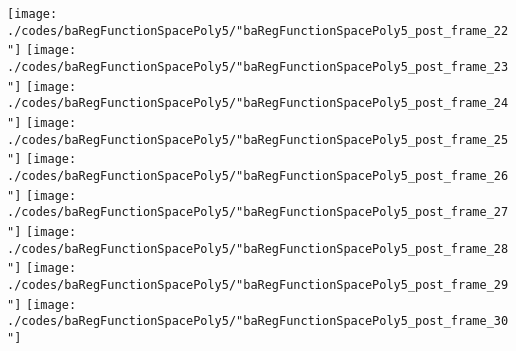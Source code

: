 \begin{frame}{\insertsection}
\begin{center}
{\begin{animateinline}{20}
				 \texttt{[image: ./codes/baRegFunctionSpacePoly5/"baRegFunctionSpacePoly5\_post\_frame\_22"]}\newframe
				 \texttt{[image: ./codes/baRegFunctionSpacePoly5/"baRegFunctionSpacePoly5\_post\_frame\_23"]}\newframe
				 \texttt{[image: ./codes/baRegFunctionSpacePoly5/"baRegFunctionSpacePoly5\_post\_frame\_24"]}\newframe
				 \texttt{[image: ./codes/baRegFunctionSpacePoly5/"baRegFunctionSpacePoly5\_post\_frame\_25"]}\newframe
				 \texttt{[image: ./codes/baRegFunctionSpacePoly5/"baRegFunctionSpacePoly5\_post\_frame\_26"]}\newframe
				 \texttt{[image: ./codes/baRegFunctionSpacePoly5/"baRegFunctionSpacePoly5\_post\_frame\_27"]}\newframe
				 \texttt{[image: ./codes/baRegFunctionSpacePoly5/"baRegFunctionSpacePoly5\_post\_frame\_28"]}\newframe
				 \texttt{[image: ./codes/baRegFunctionSpacePoly5/"baRegFunctionSpacePoly5\_post\_frame\_29"]}\newframe
				 \texttt{[image: ./codes/baRegFunctionSpacePoly5/"baRegFunctionSpacePoly5\_post\_frame\_30"]}
			 \end{animateinline}
			}
	\end{center}
    
\end{frame}


